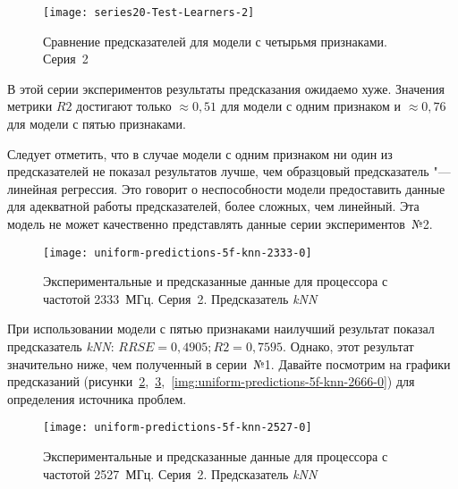 \begin{figure}[H]
    \begin{center}
            \texttt{[image: series20-Test-Learners-2]}
            \caption{Сравнение предсказателей для модели с четырьмя признаками. Серия~2}
            \label{img:series20-Test-Learners-2}
    \end{center}
\end{figure}

В этой серии экспериментов результаты предсказания ожидаемо хуже. Значения метрики $R2$ достигают только $\approx 0,51$ для модели с одним признаком и $\approx 0,76$ для модели с пятью признаками.

Следует отметить, что в случае модели с одним признаком ни один из предсказателей не показал результатов лучше, чем образцовый предсказатель "--- линейная регрессия. Это говорит о неспособности модели предоставить данные для адекватной работы предсказателей, более сложных, чем линейный. Эта модель не может качественно представлять данные серии экспериментов~№2.

\begin{figure}[H]
    \begin{center}
        \texttt{[image: uniform-predictions-5f-knn-2333-0]}
        \caption{Экспериментальные и предсказанные данные для процессора с частотой 2333~МГц. Серия~2. Предсказатель \textit{kNN}}
        \label{img:uniform-predictions-5f-knn-2333-0}
    \end{center}
\end{figure}

При использовании модели с пятью признаками наилучший результат показал предсказатель \textit{kNN}: $RRSE = 0,4905; R2 = 0,7595$. Однако, этот результат значительно ниже, чем полученный в серии~№1. Давайте посмотрим на графики предсказаний (рисунки~\ref{img:uniform-predictions-5f-knn-2333-0},~\ref{img:uniform-predictions-5f-knn-2527-0},~\ref{img:uniform-predictions-5f-knn-2666-0}) для определения источника проблем.

\begin{figure}[H]
    \begin{center}
        \texttt{[image: uniform-predictions-5f-knn-2527-0]}
        \caption{Экспериментальные и предсказанные данные для процессора с частотой 2527~МГц. Серия~2. Предсказатель \textit{kNN}}
        \label{img:uniform-predictions-5f-knn-2527-0}
    \end{center}
\end{figure}


